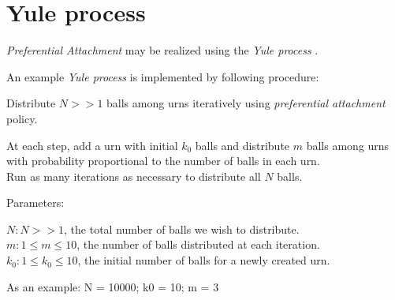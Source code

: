 \documentclass[a4paper, 12pt]{report}
\begin{document}
\section{Yule process}
\par \textit{Preferential Attachment} may be realized using the \textit{Yule process}  \cite{yule-simon-distribution}.

\par An example \textit{Yule process} is implemented by following procedure:
\par Distribute $N >> 1$ balls among urns iteratively using \textit{preferential attachment} policy.

At each step, add a urn with initial $k_0$ balls and distribute $m$ balls among urns with probability proportional to the number of balls in each urn.\\
Run as many iterations as necessary to distribute all $N$ balls.

\par Parameters:
\small
\begin{addmargin}[1cm]{1cm}%
    $N: N >> 1$, the total number of balls we wish to distribute.\\
    $m: 1 \leq m \leq 10$, the number of balls distributed at each iteration.\\
    $k_0: 1 \leq k_0 \leq 10$, the initial number of balls for a newly created urn.
\end{addmargin}

{\selectfont
As an example: N = 10000; k0 = 10; m = 3
}
\end{document}
